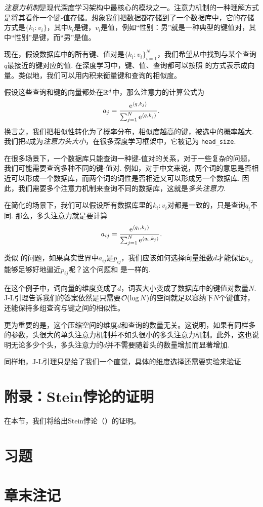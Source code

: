 \begin{example}[多头注意力]
\emph{注意力机制}是现代深度学习架构中最核心的模块之一。注意力机制的一种理解方式是将其看作一个键-值存储。想象我们把数据都存储到了一个数据库中，它的存储方式是$\{k_i:v_i\}$，其中$k_i$是键，$v_i$是值，例如“性别：男”就是一种典型的键值对，其中“性别”是键，而“男”是值。

现在，假设数据库中的所有键、值对是$\{k_i:v_i\}_{i=1}^N$，我们希望从中找到与某个查询$q$最接近的键对应的值. 在深度学习中，键、值、查询都可以按照 的方式表示成向量。类似地，我们可以用内积来衡量键和查询的相似度。

假设这些查询和键的向量都处在$\mathbb{R}^d$中，那么注意力的计算公式为
\[
    a_j = \frac{\mathrm{e}^{\left\langle{q},{k_j}\right\rangle}}{\sum_{j=1}^N \mathrm{e}^{\left\langle{q},{k_j}\right\rangle}}.
\]
换言之，我们把相似性转化为了概率分布，相似度越高的键，被选中的概率越大. 我们把$d$成为\emph{注意力头大小}，在很多深度学习框架中，它被记为 \verb#head_size#.

在很多场景下，一个数据库只能查询一种键-值对的关系，对于一些复杂的问题，我们可能需要查询多种不同的键-值对. 例如，对于中文来说，两个词的意思是否相近可以形成一个数据库，而两个词的词性是否相近又可以形成另一个数据库. 因此，我们需要多个注意力机制来查询不同的数据库，这就是\emph{多头注意力}.

在简化的场景下，我们可以假设所有数据库里的$k_i:v_i$对都是一致的，只是查询$q_i$不同. 那么，多头注意力就是要计算
\[
    a_{ij} = \frac{\mathrm{e}^{\left\langle{q_i},{k_j}\right\rangle}}{\sum_{j=1}^N \mathrm{e}^{\left\langle{q_i},{k_j}\right\rangle}}.
\]

类似 的问题，如果真实世界中$a_{ij}$是$p_{ij}$，我们应该如何选择向量维数$d$才能保证$a_{ij}$能够足够好地逼近$p_{ij}$呢？这个问题和 是一样的.

在这个例子中，词向量的维度变成了$d$，词表大小变成了数据库中的键值对数量$N$. J-L引理告诉我们的答案依然是只需要$\mathcal{O}(\log N)$的空间就足以容纳下$N$个键值对，还能保持多组查询与键之间的相似性。

更为重要的是，这个压缩空间的维度$d$和查询的数量无关。这说明，如果有同样多的参数，头很大的单头注意力机制并不如头很小的多头注意力机制。此外，这也说明无论多少个头，多头注意力的$d$并不需要随着头的数量增加而显著增加.

同样地，J-L引理只是给了我们一个直觉，具体的维度选择还需要实验来验证.
\end{example}

\section{附录：Stein悖论的证明}\label{sec:proof-stein-paradox}
在本节，我们将给出Stein悖论（）的证明。


\section{习题}


\section{章末注记}

